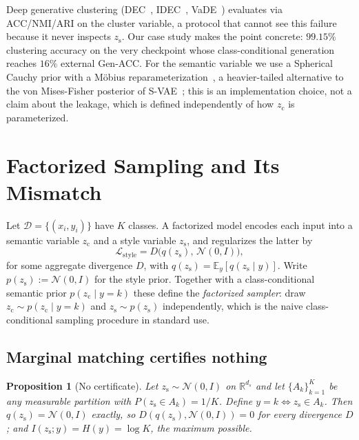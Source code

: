\documentclass[letterpaper]{article} %
\newtheorem{proposition}{Proposition}
\newcommand{\zc}{z_{\mathrm{c}}}
\newcommand{\zs}{z_{\mathrm{s}}}
\newcommand{\R}{\mathbb{R}}
\begin{document}
Deep generative
clustering (DEC~\citep{xie2015unsupervised},
IDEC~\citep{guo2017improved}, VaDE~\citep{jiang2016variational}) evaluates
via ACC/NMI/ARI on the cluster variable, a protocol that cannot see this
failure because it never inspects $\zs$. Our case study makes the point
concrete: $99.15\%$ clustering accuracy on the very checkpoint whose
class-conditional generation reaches $16\%$ external Gen-ACC. For the semantic
variable we use a Spherical Cauchy prior with a M\"obius
reparameterization~\citep{sablica2025hyperspherical}, a heavier-tailed
alternative to the von Mises-Fisher posterior of
S-VAE~\citep{davidson2018hyperspherical}; this is an implementation choice,
not a claim about the leakage, which is defined independently of how $\zc$ is
parameterized.

\section{Factorized Sampling and Its Mismatch}
\label{sec:theory}

Let $\mathcal D=\{(x_i,y_i)\}$ have $K$ classes. A factorized model encodes
each input into a semantic variable $\zc$ and a style variable $\zs$, and
regularizes the latter by
\begin{equation}
\mathcal L_{\mathrm{style}} = D\bigl(q(\zs),\,\mathcal N(0,I)\bigr),
\label{eq:style}
\end{equation}
for some aggregate divergence $D$, with $q(\zs)=\mathbb E_y[q(\zs\mid y)]$.
Write $p(\zs):=\mathcal N(0,I)$ for the style prior. Together with a
class-conditional semantic prior $p(\zc\mid y{=}k)$ these define the
\emph{factorized sampler}: draw $\zc\sim p(\zc\mid y{=}k)$ and $\zs\sim
p(\zs)$ independently, which is the naive class-conditional sampling
procedure in standard use.

\subsection{Marginal matching certifies nothing}

\begin{proposition}[No certificate]
\label{prop:nocert}
Let $\zs\sim\mathcal N(0,I)$ on $\R^{d_s}$ and let $\{A_k\}_{k=1}^K$ be any
measurable partition with $P(\zs\in A_k)=1/K$. Define $y=k \iff \zs\in A_k$.
Then $q(\zs)=\mathcal N(0,I)$ exactly, so $D(q(\zs),\mathcal N(0,I))=0$ for
\emph{every} divergence $D$; and $I(\zs;y)=H(y)=\log K$, the maximum
possible.
\end{proposition}
\end{document}
